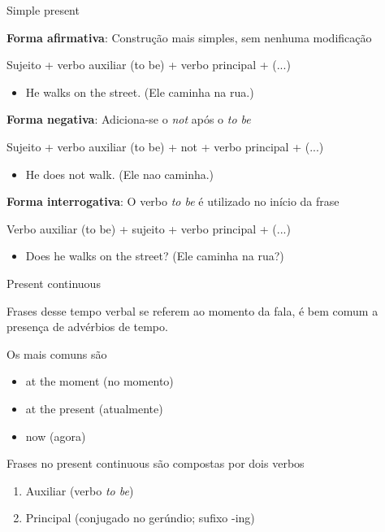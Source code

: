 \documentclass[compress,mathserif,xcolor=table]{beamer}
\begin{document}
\begin{frame}{Simple present}

\textbf{Forma afirmativa}: Construção mais simples, sem nenhuma modificação

Sujeito + verbo auxiliar (to be) + verbo principal + (...)
\begin{itemize}
    \item He walks on the street. (Ele caminha na rua.)
\end{itemize}

\vspace{0.25cm}

\textbf{Forma negativa}: Adiciona-se o \textit{not} após o \textit{to be}

Sujeito + verbo auxiliar (to be) + not + verbo principal + (...)
\begin{itemize}
    \item He does not walk. (Ele nao caminha.)
\end{itemize}

\vspace{0.25cm}

\textbf{Forma interrogativa}: O verbo \textit{to be} é utilizado no início da frase

Verbo auxiliar (to be) + sujeito + verbo principal + (...)
\begin{itemize}
    \item Does he walks on the street? (Ele caminha na rua?)
\end{itemize}

\end{frame}




\begin{frame}{Present continuous}

Frases desse tempo verbal se referem ao momento da fala, é bem comum a presença de advérbios de tempo. 

Os mais comuns são

\begin{itemize}
    \item at the moment (no momento)
    \item at the present (atualmente) 
    \item now (agora)
\end{itemize}

\vspace{0.5cm}

Frases no present continuous são compostas por dois verbos
\begin{enumerate}
    \item Auxiliar (verbo \textit{to be})
    \item Principal (conjugado no gerúndio; sufixo -ing)
\end{enumerate}

\end{frame}
\end{document}
